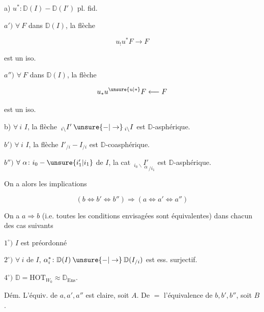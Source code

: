 a) $u^*\colon\mathbb{D}(I)\mathbin{-}\mathbb{D}(I')$ pl. fid.

$a')$ $\forall\ F$ dans $\mathbb{D}(I)$, la flèche

\[
 u_!u^*F\longrightarrow F
\]

est un iso. 

$a'')$ $\forall\ F$ dans $\mathbb{D}(I)$, la flèche

\[
 u_*u^{\unsure{u|*}}F\longleftarrow F
\]

est un iso. 

b) $\forall\ i$  $I$, la flèche $\,{}_{i\backslash}I'\mathbin{\unsure{-|\to}}{}_{i\backslash}I$ est $\mathbb{D}$-asphérique.

$b')$ $\forall\ i$  $I$, la flèche $I'_{/i}\mathbin{-}I_{/i}$ est $\mathbb{D}$-coasphérique.

$b'')$ $\forall\ \alpha\colon i_0\mathbin{-}\unsure{i_1'|i_1}$ de $I$, la cat $\,{}_{i_0\backslash}\underset{\alpha}{I'}_{/i_1}$ est $\mathbb{D}$-asphérique.

On a alors les implications

\[
 (b\Longleftrightarrow b'\Longleftrightarrow b'')\Longrightarrow
 (a\Longleftrightarrow a'\Longleftrightarrow a'')
\]

 On a $a\Rightarrow b$ (i.e. toutes les conditions  envisagées sont équivalentes)
dans chacun des cas suivants

$1^\circ)$ $I$ est préordonné

$2^\circ)$ $\forall\ i$ de $I$, $\alpha_i^*\colon\mathbb{D}(I)\mathbin{\unsure{-|\to}}\mathbb{D}(I_{/i})$ est ess. surjectif.


$4^\circ)$ $\mathbb{D}=\mathrm{HOT}_{W_0}\approx\mathbb{D}_{\mathrm{Ens}}$.

Dém. L'équiv. de $a,a',a''$ est claire, soit $A$. De $=$ l'équivalence de $b,b',b''$, soit $B$.

